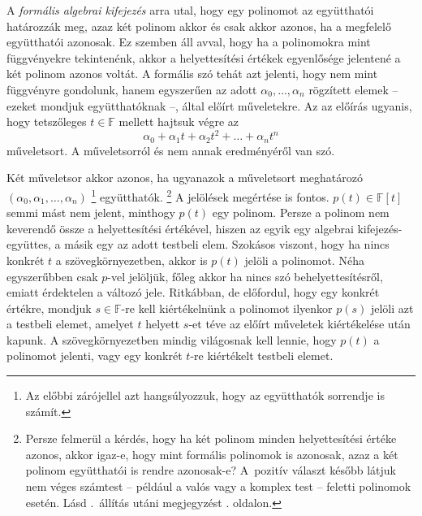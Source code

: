\documentclass[a4paper, showtrims]{memoir}
\theoremstyle{plain}
\theoremstyle{remark}
\theoremstyle{definition}
\begin{document}
A \emph{formális algebrai kifejezés} arra utal,
hogy egy polinomot az együtthatói határozzák meg,
azaz két polinom akkor és csak akkor azonos,
ha a megfelelő együtthatói azonosak.
Ez szemben áll avval, hogy ha a polinomokra mint függvényekre tekintenénk,
akkor a helyettesítési értékek egyenlősége jelentené a két polinom azonos voltát.
A formális szó tehát azt jelenti, hogy nem mint függvényre gondolunk,
hanem egyszerűen az adott $\alpha_0,\ldots,\alpha_n$ rögzített elemek -- ezeket mondjuk együtthatóknak --,
által előírt műveletekre.
Az az előírás ugyanis, hogy tetszőleges $t\in\mathbb{F}$ mellett hajtsuk végre az
\[
	\alpha_0+\alpha_1t+\alpha_2t^2+\ldots+\alpha_nt^n
\]
műveletsort.
A műveletsorról és nem annak eredményéről van szó.


Két műveletsor akkor azonos, ha ugyanazok a műveletsort meghatározó
$\left( \alpha_0,\alpha_1,\ldots,\alpha_n \right)$%
\footnote{Az előbbi zárójellel azt hangsúlyozzuk, hogy az együtthatók sorrendje is számít.}
együtthatók.%
\footnote{Persze felmerül a kérdés,
	hogy ha két polinom minden helyettesítési értéke azonos,
	akkor igaz-e,
	hogy mint formális polinomok is azonosak,
	azaz a két polinom együtthatói is rendre azonosak-e?
	A~pozitív választ később látjuk nem véges számtest -- például a valós vagy a komplex test -- feletti polinomok esetén.
    Lásd .~állítás utáni megjegyzést \aazt{\pageref{pr:polinomfv}}. oldalon.%
}
A jelölések megértése is fontos.
$p\left( t \right)\in\mathbb{F}\left[ t \right]$ semmi mást nem jelent,
minthogy $p\left( t \right)$ egy polinom.
Persze a polinom nem keverendő össze a helyettesítési értékével,
hiszen az egyik egy algebrai kifejezés-együttes, a másik egy az adott testbeli elem.
Szokásos viszont, hogy ha nincs konkrét $t$ a szövegkörnyezetben, akkor is $p\left( t \right)$ jelöli a polinomot.
Néha egyszerűbben csak $p$-vel jelöljük, főleg akkor ha nincs szó behelyettesítésről,
emiatt érdektelen a változó jele.
Ritkábban, de előfordul, hogy egy konkrét értékre, mondjuk $s\in\mathbb{F}$-re kell kiértékelnünk a polinomot ilyenkor $p\left( s \right)$ jelöli azt a testbeli elemet,
amelyet $t$ helyett $s$-et téve az előírt műveletek kiértékelése után kapunk.
A szövegkörnyezetben mindig világosnak kell lennie, hogy $p\left( t \right)$ a polinomot jelenti,
vagy egy konkrét $t$-re kiértékelt testbeli elemet.
\end{document}
